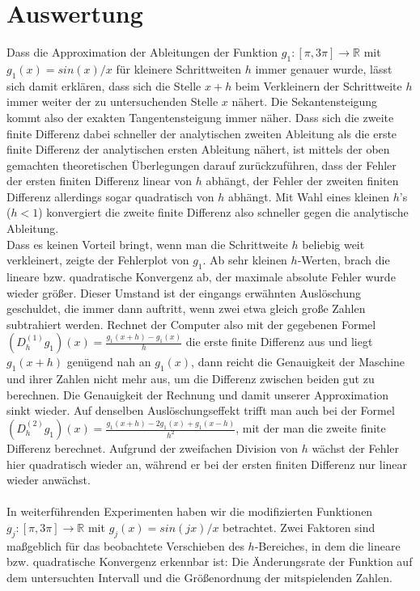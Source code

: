 \documentclass{scrartcl}
\begin{document}
\pagebreak \section{Auswertung}
\label{sec:auswertung}
Dass die Approximation der Ableitungen der Funktion $g_1:[\pi, 3\pi] \rightarrow \mathbb{R}$ mit $g_1(x)=sin(x)/x$ für kleinere Schrittweiten $h$ immer genauer wurde, lässt sich damit erklären, dass sich die Stelle $x+h$ beim Verkleinern der Schrittweite $h$ immer weiter der zu untersuchenden Stelle $x$ nähert.
Die Sekantensteigung kommt also der exakten Tangentensteigung immer näher.
Dass sich die zweite finite Differenz dabei schneller der analytischen zweiten Ableitung als die erste finite Differenz der analytischen ersten Ableitung nähert, ist mittels der oben gemachten theoretischen Überlegungen darauf zurückzuführen, dass der Fehler der ersten finiten Differenz linear von $h$ abhängt, der Fehler der zweiten finiten Differenz allerdings sogar quadratisch von $h$ abhängt.
Mit Wahl eines kleinen $h$'s ($h<1$) konvergiert die zweite finite Differenz also schneller gegen die analytische Ableitung. \\
Dass es keinen Vorteil bringt, wenn man die Schrittweite $h$ beliebig weit verkleinert, zeigte der Fehlerplot von $g_1$. Ab sehr kleinen $h$-Werten, brach die lineare bzw. quadratische Konvergenz ab, der maximale absolute Fehler wurde wieder größer.
Dieser Umstand ist der eingangs erwähnten Auslöschung geschuldet, die immer dann auftritt, wenn zwei etwa gleich große Zahlen subtrahiert werden.
Rechnet der Computer also mit der gegebenen Formel $(D_h^{(1)}g_1)(x) = \frac{g_1(x+h)-g_1(x)}{h}$ die erste finite Differenz aus und liegt $g_1(x+h)$ genügend nah an $g_1(x)$, dann reicht die Genauigkeit der Maschine und ihrer Zahlen nicht mehr aus, um die Differenz zwischen beiden gut zu berechnen. Die Genauigkeit der Rechnung und damit unserer Approximation sinkt wieder.
Auf denselben Auslöschungseffekt trifft man auch bei der Formel $(D_h^{(2)}g_1)(x) = \frac{g_1(x+h)-2g_1(x)+g_1(x-h)}{h^2}$, mit der man die zweite finite Differenz berechnet.
Aufgrund der zweifachen Division von $h$ wächst der Fehler hier quadratisch wieder an, während er bei der ersten finiten Differenz nur linear wieder anwächst. \\
 \\
In weiterführenden Experimenten haben wir die modifizierten Funktionen $g_j:[\pi, 3\pi] \rightarrow \mathbb{R}$ mit $g_j(x) = sin(j x)/x$ betrachtet. Zwei Faktoren sind maßgeblich für das beobachtete Verschieben des $h$-Bereiches, in dem die lineare bzw. quadratische Konvergenz erkennbar ist: Die Änderungsrate der Funktion auf dem untersuchten Intervall und die Größenordnung der mitspielenden Zahlen. \\
\end{document}

